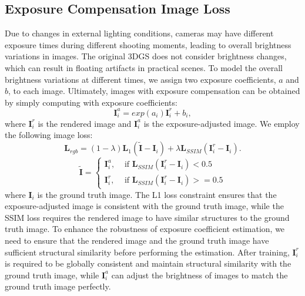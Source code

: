 \documentclass[lettersize,journal]{IEEEtran}
\begin{document}
\subsection{Exposure Compensation Image Loss}
Due to changes in external lighting conditions, cameras may have different exposure times during different shooting moments, leading to overall brightness variations in images. The original 3DGS does not consider brightness changes, which can result in floating artifacts in practical scenes. To model the overall brightness variations at different times, we assign two exposure coefficients, $a$ and $b$, to each image. Ultimately, images with exposure compensation can be obtained by simply computing with exposure coefficients:
\begin{equation}
    \bm{I}_i^a=exp(a_i)\bm{I}_i^r+b_i,
\end{equation}
where $\bm{I}_i^r$ is the rendered image and $\bm{I}_i^a$ is the exposure-adjusted image.
We employ the following image loss:
\begin{equation}
    \bm{L}_{rgb}=(1-\lambda)\bm{L}_1(\tilde{\bm{I}}-\bm{I}_i)+\lambda\bm{L}_{SSIM}(\bm{I}_i^r-\bm{I}_i).
\end{equation}
\begin{equation}
    \tilde{\bm{I}} =\begin{cases}\bm{I}_i^a,
 & \text{ if } \bm{L}_{SSIM}(\bm{I}_i^r-\bm{I}_i) < 0.5
 \\\bm{I}_i^r,
  & \text{ if } \bm{L}_{SSIM}(\bm{I}_i^r-\bm{I}_i) >= 0.5
\end{cases}
\end{equation}
where $\bm{I}_i$ is the ground truth image. The L1 loss constraint ensures that the exposure-adjusted image is consistent with the ground truth image, while the SSIM loss requires the rendered image to have similar structures to the ground truth image. To enhance the robustness of exposure coefficient estimation, we need to ensure that the rendered image and the ground truth image have sufficient structural similarity before performing the estimation. After training, $\bm{I}_i^r$ is required to be globally consistent and maintain structural similarity with the ground truth image, while $\bm{I}_i^a$ can adjust the brightness of images to match the ground truth image perfectly.
\end{document}
